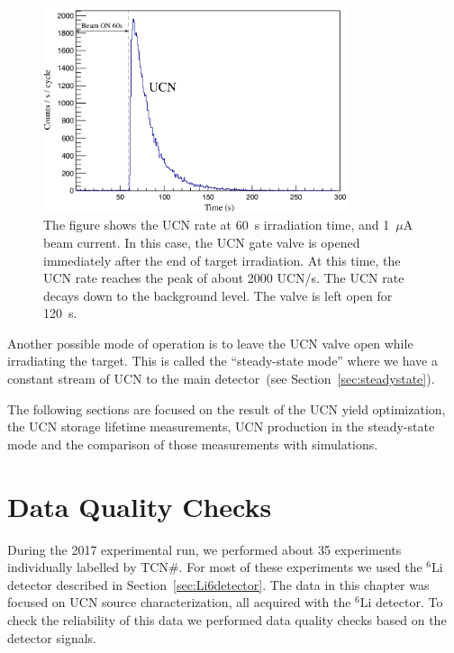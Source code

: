 \begin{figure}[h!]
  \centering
  \includegraphics[width=0.8\textwidth]{UCNRate.png}
  \caption[UCN rate at 1~$\mu$A beam current and 60~s target
  irradiation]{The figure shows the UCN rate at 60~s irradiation time,
    and 1~$\mu$A beam current. In this case, the UCN gate valve is
    opened immediately after the end of target irradiation. At this
    time, the UCN rate reaches the peak of about 2000 UCN/s. The UCN
    rate decays down to the background level. The valve is left open
    for 120~s. }
  \label{fig:UCNRate}
\end{figure}


Another possible mode of operation is to leave the UCN valve open
while irradiating the target. This is called the ``steady-state mode''
where we have a constant stream of UCN to the main detector~(see
Section~\ref{sec:steadystate}).

The following sections are focused on the result of the UCN yield
optimization, the UCN storage lifetime measurements, UCN production in
the steady-state mode and the comparison of those measurements with
simulations.


\section {Data Quality Checks}
During the 2017 experimental run, we performed about 35 experiments
individually labelled by TCN\#. For most of these experiments we used
the $^6\mathrm{Li}$ detector described in
Section~\ref{sec:Li6detector}. The data in this chapter was focused on
UCN source characterization, all acquired with the $^6\mathrm{Li}$
detector.  To check the reliability of this data we performed data
quality checks based on the detector signals.




